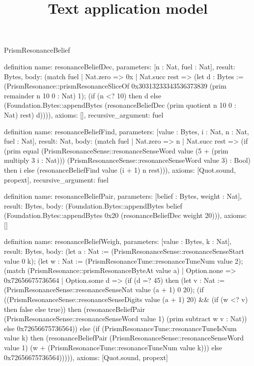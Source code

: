 \begin{lexlean}{PrismResonanceBelief}
\title{Text application model}
\begin{semanticmodule}
definition{
  name: resonanceBeliefDec,
  parameters: [n : Nat, fuel : Nat],
  result: Bytes,
  body: (match fuel
    | Nat.zero => 0x
    | Nat.succ rest => (let d : Bytes := (PrismResonance::prismResonanceSliceOf 0x30313233343536373839 (prim remainder n 10 0 : Nat) 1); (if (n <? 10) then d else (Foundation.Bytes::appendBytes (resonanceBeliefDec (prim quotient n 10 0 : Nat) rest) d)))),
  axioms: [],
  recursive_argument: fuel
}

definition{
  name: resonanceBeliefFind,
  parameters: [value : Bytes, i : Nat, n : Nat, fuel : Nat],
  result: Nat,
  body: (match fuel
    | Nat.zero => n
    | Nat.succ rest => (if (prim equal (PrismResonanceSense::resonanceSenseWord value (5 + (prim multiply 3 i : Nat))) (PrismResonanceSense::resonanceSenseWord value 3) : Bool) then i else (resonanceBeliefFind value (i + 1) n rest))),
  axioms: [Quot.sound, propext],
  recursive_argument: fuel
}

definition{
  name: resonanceBeliefPair,
  parameters: [belief : Bytes, weight : Nat],
  result: Bytes,
  body: (Foundation.Bytes::appendBytes belief (Foundation.Bytes::appendBytes 0x20 (resonanceBeliefDec weight 20))),
  axioms: []
}

definition{
  name: resonanceBeliefWeigh,
  parameters: [value : Bytes, k : Nat],
  result: Bytes,
  body: (let a : Nat := (PrismResonanceSense::resonanceSenseStart value 0 k); (let w : Nat := (PrismResonanceTune::resonanceTuneNum value 2); (match (PrismResonance::prismResonanceByteAt value a)
    | Option.none => 0x72656675736564
    | Option.some d => (if (d =? 45) then (let v : Nat := (PrismResonanceSense::resonanceSenseNat value (a + 1) 0 20); (if ((PrismResonanceSense::resonanceSenseDigits value (a + 1) 20) && (if (w <? v) then false else true)) then (resonanceBeliefPair (PrismResonanceSense::resonanceSenseWord value 1) (prim subtract w v : Nat)) else 0x72656675736564)) else (if (PrismResonanceTune::resonanceTuneIsNum value k) then (resonanceBeliefPair (PrismResonanceSense::resonanceSenseWord value 1) (w + (PrismResonanceTune::resonanceTuneNum value k))) else 0x72656675736564))))),
  axioms: [Quot.sound, propext]
}


\end{semanticmodule}
\end{lexlean}
